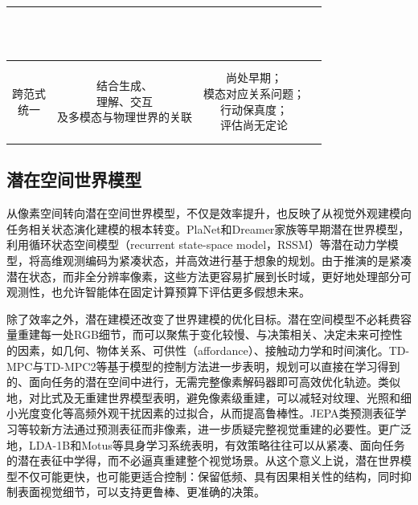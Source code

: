 \begin{table}[t]
{\begin{tabular}{@{} c | c | c | c @{}}
{\citep{kerbl20233dgaussians}\\
\citep{worldlabs2025marble}\\
\citep{wu2023slotformer}\\
\citep{huang2025enerverse}} \\
\hline
\makecell{跨范式\\统一} &
\makecell{结合生成、\\理解、交互\\及多模态与物理世界的关联} &
\makecell{尚处早期；\\
模态对应关系问题；\\
行动保真度；\\
评估尚无定论} &
\makecell{\citep{liu2025lwm}\\
\citep{ge2024worldgpt}\\
\citep{zhou2025hermes}\\
\citep{ye2026dreamzero}\\
\citep{zhu2025uwm}\\
\citep{nvidia2026cosmos3}} \\
\hline
\end{tabular}}
\end{table}

\subsection{潜在空间世界模型}
从像素空间转向潜在空间世界模型，不仅是效率提升，也反映了从视觉外观建模向任务相关状态演化建模的根本转变。PlaNet\citep{hafner2019planet}和Dreamer家族\citep{hafner2019dreamer,hafner2021dreamerv2,hafner2023dreamerv3}等早期潜在世界模型，利用循环状态空间模型（recurrent state-space model，RSSM）等潜在动力学模型，将高维观测编码为紧凑状态，并高效进行基于想象的规划。由于推演的是紧凑潜在状态，而非全分辨率像素，这些方法更容易扩展到长时域，更好地处理部分可观测性，也允许智能体在固定计算预算下评估更多假想未来。

除了效率之外，潜在建模还改变了世界建模的优化目标。潜在空间模型不必耗费容量重建每一处RGB细节，而可以聚焦于变化较慢、与决策相关、决定未来可控性的因素，如几何、物体关系、可供性（affordance）、接触动力学和时间演化。TD-MPC与TD-MPC2等基于模型的控制方法\citep{hansen2022tdmpc,hansen2023tdmpc2}进一步表明，规划可以直接在学习得到的、面向任务的潜在空间中进行，无需完整像素解码器即可高效优化轨迹。类似地，对比式及无重建世界模型\citep{kipf2019cswm,okada2022dreamingv2,poudel2023recore}表明，避免像素级重建，可以减轻对纹理、光照和细小光度变化等高频外观干扰因素的过拟合，从而提高鲁棒性。JEPA类预测表征学习等较新方法\citep{assran2023ijepa,bardes2024vjepa,assran2025vjepa2}通过预测表征而非像素，进一步质疑完整视觉重建的必要性。更广泛地，LDA-1B\citep{lyu2026lda1b}和Motus\citep{bi2025motus}等具身学习系统表明，有效策略往往可以从紧凑、面向任务的潜在表征中学得，而不必逼真重建整个视觉场景。从这个意义上说，潜在世界模型不仅可能更快，也可能更适合控制：保留低频、具有因果相关性的结构，同时抑制表面视觉细节，可以支持更鲁棒、更准确的决策。

